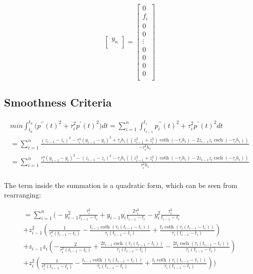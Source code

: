 \documentclass{article}
\DeclareMathOperator{\csch}{csch}
\begin{document}
\begin{equation*}
\begin{bmatrix}
        y_n \\
    \end{bmatrix} =
    \begin{bmatrix}
        0 \\
        f_i \\
        0 \\
        0 \\
        \vdots \\
        0 \\
        0 \\
        0 \\
        0 \\
    \end{bmatrix}
\end{equation*}

\subsection{Smoothness Criteria}

\begin{multline}
    min \int_{t_0}^{t_n} \bigl( p^{\prime\prime}(t)^2 + \tau_i^2 p^{\prime}(t)^2 \bigr) dt = 
    \sum_{i=1}^{n}\int_{t_{i - 1}}^{t_i}p^{\prime\prime}_i(t)^2 + \tau_i^2 p^{\prime}(t)^2 dt \\
    = \sum_{i=1}^{n} \frac{(z_{i-1}-z_i)^2 - \tau_i^4 (y_{i-1}-y_i)^2 +\tau_i h_i \left((z_{i-1}^2+z_i^2) 
    \coth (-\tau_i h_i) - 2 z_{i-1} z_i \csch (-\tau_i h_i)\right)}{-\tau_i^2 h_i} \\
    = \sum_{i=1}^{n} \frac{\tau_i^4 (y_{i-1}-y_i)^2 - (z_{i-1}-z_i)^2 -\tau_i h_i \left((z_{i-1}^2+z_i^2) 
    \coth (-\tau_i h_i) - 2 z_{i-1} z_i \csch (-\tau_i h_i)\right)}{\tau_i^2 h_i} \\
\end{multline}

The term inside the summation is a quadratic form, which can be seen from rearranging:

\begin{multline}
    = \sum_{i=1}^{n} \biggl( -y_{i-1}^2\frac{\tau_i ^2}{t_{i-1}-t_i} 
    +y_{i-1} y_i\frac{2 \tau_i ^2}{t_{i-1}-t_i}
    -y_i^2\frac{\tau_i ^2}{t_{i-1}-t_i} \\
    +z_{i-1}^2 \left(\frac{1}{\tau_i ^2 (t_{i-1}-t_i)}-\frac{t_{i-1} \coth (\tau_i (t_{i-1}-t_i))}{\tau_i (t_{i-1}-t_i)}
    +\frac{t_i \coth (\tau_i (t_{i-1}-t_i))}{\tau_i  (t_{i-1}-t_i)}\right) \\
    +z_{i-1} z_i \left(-\frac{2}{\tau_i ^2 (t_{i-1}-t_i)}+\frac{2 t_{i-1} \csch(\tau_i  (t_{i-1}-t_i))}{\tau_i  (t_{i-1}-t_i)}-\frac{2 t_i \csch(\tau_i  (t_{i-1}-t_i))}{\tau_i  (t_{i-1}-t_i)}\right) \\
    +z_i^2 \left(\frac{1}{\tau_i ^2 (t_{i-1}-t_i)}-\frac{t_{i-1} \coth (\tau_i  (t_{i-1}-t_i))}{\tau_i  (t_{i-1}-t_i)}+\frac{t_i \coth (\tau_i  (t_{i-1}-t_i))}{\tau_i  (t_{i-1}-t_i)}\right) \biggr)
\end{multline}
\end{document}
